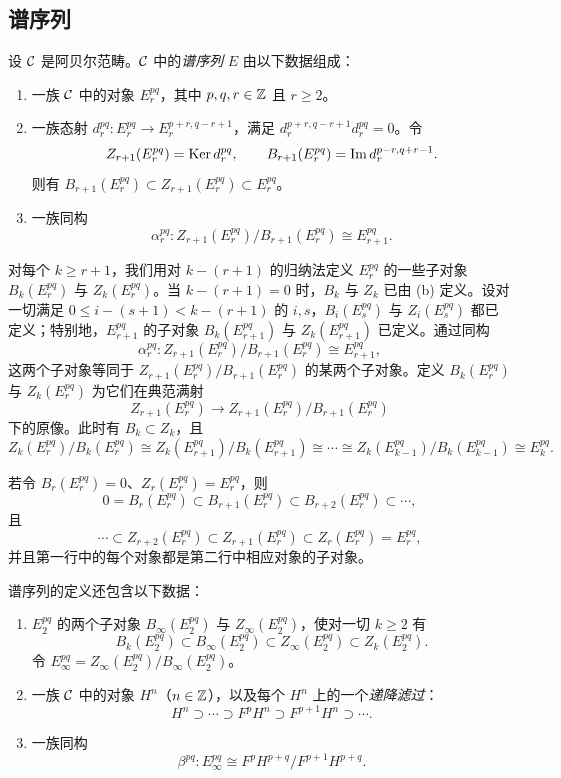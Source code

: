 \subsection{谱序列}
\label{sec:2.2}

设 $\mathcal{C}$ 是阿贝尔范畴。$\mathcal{C}$ 中的\emph{谱序列} $E$ 由以下数据组成：
\begin{enumerate}[label=(\alph*),leftmargin=2.8em]
  \item 一族 $\mathcal{C}$ 中的对象 $E_r^{pq}$，其中 $p,q,r\in\mathbb{Z}$ 且 $r\ge 2$。
  \item 一族态射 $d_r^{pq}\colon E_r^{pq}\to E_r^{p+r,q-r+1}$，满足 $d_r^{p+r,q-r+1}d_r^{pq}=0$。令
  \[
  Z_{r+1}(E_r^{pq})=\operatorname{Ker} d_r^{pq},\qquad B_{r+1}(E_r^{pq})=\operatorname{Im} d_r^{p-r,q+r-1}.
  \]
  则有 $B_{r+1}(E_r^{pq})\subset Z_{r+1}(E_r^{pq})\subset E_r^{pq}$。
  \item 一族同构
  \[
  \alpha_r^{pq}\colon Z_{r+1}(E_r^{pq})/B_{r+1}(E_r^{pq})\cong E_{r+1}^{pq}.
  \]
\end{enumerate}

对每个 $k\ge r+1$，我们用对 $k-(r+1)$ 的归纳法定义 $E_r^{pq}$ 的一些子对象 $B_k(E_r^{pq})$ 与 $Z_k(E_r^{pq})$。当 $k-(r+1)=0$ 时，$B_k$ 与 $Z_k$ 已由 (b) 定义。设对一切满足 $0\le i-(s+1)<k-(r+1)$ 的 $i,s$，$B_i(E_s^{pq})$ 与 $Z_i(E_s^{pq})$ 都已定义；特别地，$E_{r+1}^{pq}$ 的子对象 $B_k(E_{r+1}^{pq})$ 与 $Z_k(E_{r+1}^{pq})$ 已定义。通过同构
\[
\alpha_r^{pq}\colon Z_{r+1}(E_r^{pq})/B_{r+1}(E_r^{pq})\cong E_{r+1}^{pq},
\]
这两个子对象等同于 $Z_{r+1}(E_r^{pq})/B_{r+1}(E_r^{pq})$ 的某两个子对象。定义 $B_k(E_r^{pq})$ 与 $Z_k(E_r^{pq})$ 为它们在典范满射
\[
Z_{r+1}(E_r^{pq})\to Z_{r+1}(E_r^{pq})/B_{r+1}(E_r^{pq})
\]
下的原像。此时有 $B_k\subset Z_k$，且
\[
Z_k(E_r^{pq})/B_k(E_r^{pq})\cong Z_k(E_{r+1}^{pq})/B_k(E_{r+1}^{pq})\cong\cdots\cong Z_k(E_{k-1}^{pq})/B_k(E_{k-1}^{pq})\cong E_k^{pq}.
\]

若令 $B_r(E_r^{pq})=0$、$Z_r(E_r^{pq})=E_r^{pq}$，则
\[
0=B_r(E_r^{pq})\subset B_{r+1}(E_r^{pq})\subset B_{r+2}(E_r^{pq})\subset\cdots,
\]
且
\[
\cdots\subset Z_{r+2}(E_r^{pq})\subset Z_{r+1}(E_r^{pq})\subset Z_r(E_r^{pq})=E_r^{pq},
\]
并且第一行中的每个对象都是第二行中相应对象的子对象。

谱序列的定义还包含以下数据：
\begin{enumerate}[label=(\alph*),leftmargin=2.8em,start=4]
  \item $E_2^{pq}$ 的两个子对象 $B_\infty(E_2^{pq})$ 与 $Z_\infty(E_2^{pq})$，使对一切 $k\ge 2$ 有
  \[
  B_k(E_2^{pq})\subset B_\infty(E_2^{pq})\subset Z_\infty(E_2^{pq})\subset Z_k(E_2^{pq}).
  \]
  令 $E_\infty^{pq}=Z_\infty(E_2^{pq})/B_\infty(E_2^{pq})$。
  \item 一族 $\mathcal{C}$ 中的对象 $H^n$（$n\in\mathbb{Z}$），以及每个 $H^n$ 上的一个\emph{递降滤过}：
  \[
  H^n\supset\cdots\supset F^pH^n\supset F^{p+1}H^n\supset\cdots.
  \]
  \item 一族同构
  \[
  \beta^{pq}\colon E_\infty^{pq}\cong F^pH^{p+q}/F^{p+1}H^{p+q}.
  \]
\end{enumerate}

